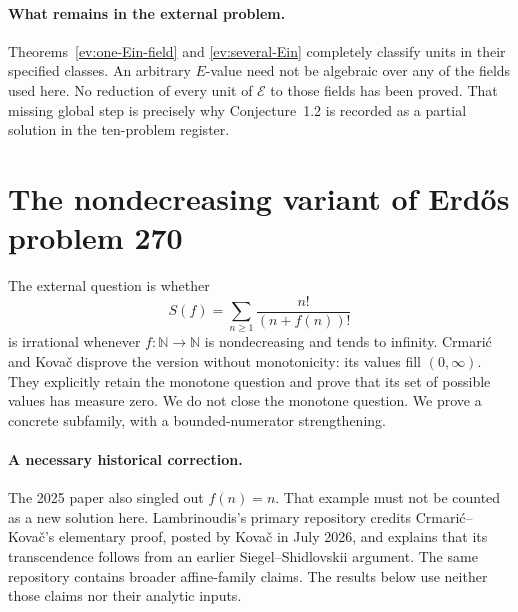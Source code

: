 \documentclass[11pt,a4paper]{article}
\numberwithin{equation}{section}
\theoremstyle{definition}
\theoremstyle{remark}
\begin{document}
\paragraph{What remains in the external problem.}
Theorems~\ref{ev:one-Ein-field} and \ref{ev:several-Ein} completely
classify units in their specified classes.  An arbitrary $E$-value
need not be algebraic over any of the fields used here.  No reduction
of every unit of $\mathcal E$ to those fields has been proved.  That
missing global step is precisely why Conjecture~1.2 is recorded as a
partial solution in the ten-problem register.



\section{The nondecreasing variant of Erd\H{o}s problem 270}
\label{es:270}

The external question is whether
\begin{equation}\label{es:270-series}
 S(f)=\sum_{n\ge1}\frac{n!}{(n+f(n))!}
\end{equation}
is irrational whenever $f:\mathbb N\to\mathbb N$ is nondecreasing
and tends to infinity.  Crmari\'c and Kova\v{c}
\cite{CrKo2025} disprove the version without monotonicity: its
values fill $(0,\infty)$.  They explicitly retain the monotone
question and prove that its set of possible values has measure zero.
We do not close the monotone question.  We prove a concrete
subfamily, with a bounded-numerator strengthening.

\paragraph{A necessary historical correction.}
The 2025 paper also singled out $f(n)=n$.  That example must not be
counted as a new solution here.  Lambrinoudis's primary repository
\cite{Lambrinoudis270} credits Crmari\'c--Kova\v{c}'s elementary
proof, posted by Kova\v{c} in July 2026, and explains that its
transcendence follows from an earlier Siegel--Shidlovskii argument.
The same repository contains broader affine-family claims.  The
results below use neither those claims nor their analytic inputs.
\end{document}
